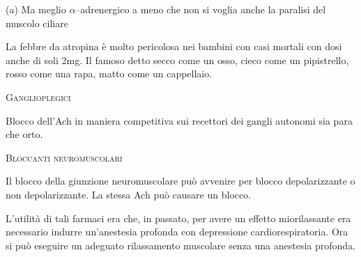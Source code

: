 (a) Ma meglio $\alpha$--adrenergico a meno che non si voglia anche la paralisi del muscolo ciliare


La febbre da atropina è molto pericolosa nei bambini con casi mortali con dosi anche di soli 2mg. Il famoso detto secco come un osso, cieco come un pipistrello, rosso come una rapa, matto come un cappellaio.

\textsc{Ganglioplegici}

Blocco dell'Ach in maniera competitiva sui recettori dei gangli autonomi sia para che orto.



\textsc{Bloccanti neuromuscolari}

Il blocco della giunzione neuromuscolare può avvenire per blocco depolarizzante o non depolarizzante. La stessa Ach può causare un blocco.

L'utilità di tali farmaci era che, in passato, per avere un effetto miorilassante era necessario  indurre un'anestesia profonda con depressione cardiorespiratoria. Ora si può eseguire un adeguato rilassamento muscolare senza una anestesia profonda.

